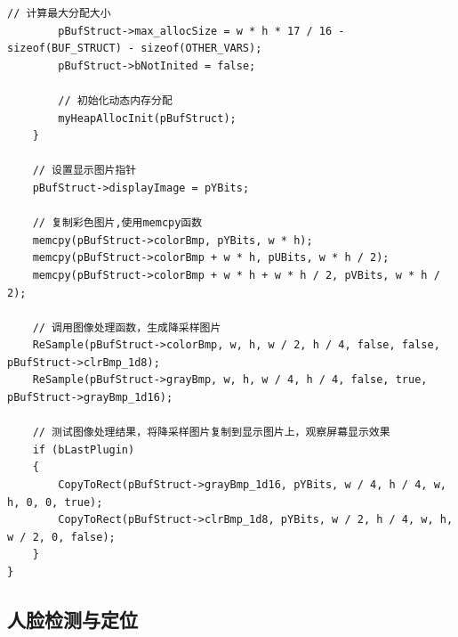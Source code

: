 \documentclass[12pt,hyperref,a4paper,UTF8]{ctexart}
\begin{document}
\begin{lstlisting}[caption={插件主函数}, label={lst:example}]
        // 计算最大分配大小
        pBufStruct->max_allocSize = w * h * 17 / 16 - sizeof(BUF_STRUCT) - sizeof(OTHER_VARS);
        pBufStruct->bNotInited = false;

        // 初始化动态内存分配
        myHeapAllocInit(pBufStruct);
    }

    // 设置显示图片指针
    pBufStruct->displayImage = pYBits;

    // 复制彩色图片,使用memcpy函数
    memcpy(pBufStruct->colorBmp, pYBits, w * h);
    memcpy(pBufStruct->colorBmp + w * h, pUBits, w * h / 2);
    memcpy(pBufStruct->colorBmp + w * h + w * h / 2, pVBits, w * h / 2);

    // 调用图像处理函数，生成降采样图片
    ReSample(pBufStruct->colorBmp, w, h, w / 2, h / 4, false, false, pBufStruct->clrBmp_1d8);
    ReSample(pBufStruct->grayBmp, w, h, w / 4, h / 4, false, true, pBufStruct->grayBmp_1d16);

    // 测试图像处理结果，将降采样图片复制到显示图片上，观察屏幕显示效果
    if (bLastPlugin)
    {
        CopyToRect(pBufStruct->grayBmp_1d16, pYBits, w / 4, h / 4, w, h, 0, 0, true);
        CopyToRect(pBufStruct->clrBmp_1d8, pYBits, w / 2, h / 4, w, h, w / 2, 0, false);
    }
}
        \end{lstlisting}








    \subsection{人脸检测与定位}
\end{document}

